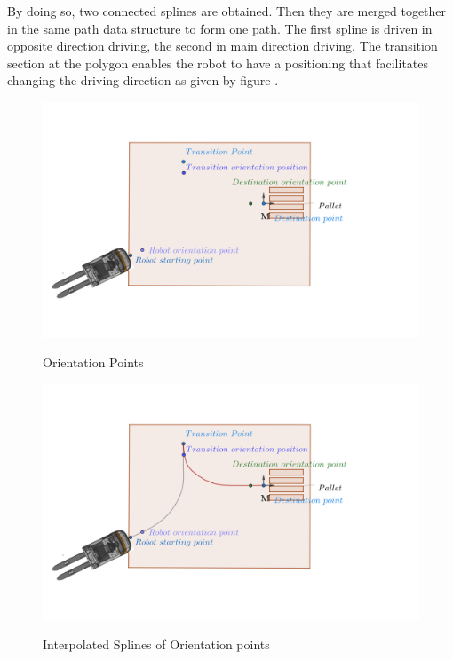 By doing so, two connected splines are obtained. Then they are merged together in the same path data structure to 
form one path. The first spline is driven in opposite direction driving, the second in main direction driving. 
The transition section at the polygon enables the robot to have a positioning that facilitates changing the driving direction
as given by figure .

\begin{figure}[H]
    \begin{center}
        \includegraphics[width=5in]{images/Chap2/Orientation_points.png}\\
        \caption{Orientation Points}
        \label{Orientation}
        \end{center}    
\end{figure}

\begin{figure}[H]
    \begin{center}
        \includegraphics[width=5in]{images/Chap2/Orientation_points_with_spline.png}\\
        \caption{Interpolated Splines of Orientation points}
        \label{Spline ori}
        \end{center}    
\end{figure}

